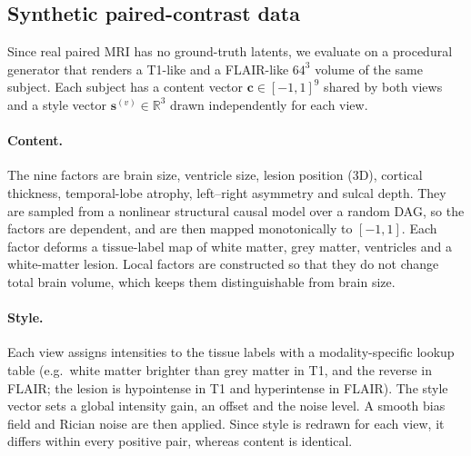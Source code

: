 
\subsection{Synthetic paired-contrast data}
\label{sec:synthetic-data}

Since real paired MRI has no ground-truth latents, we evaluate on a procedural
generator that renders a T1-like and a FLAIR-like $64^3$ volume of the same
subject. Each subject has a content vector $\mathbf{c}\in[-1,1]^{9}$ shared by
both views and a style vector $\mathbf{s}^{(v)}\in\mathbb{R}^{3}$ drawn
independently for each view.

\paragraph{Content.}
The nine factors are brain size, ventricle size, lesion position (3D),
cortical thickness, temporal-lobe atrophy, left--right asymmetry and sulcal
depth. They are sampled from a nonlinear structural causal model over a random
DAG, so the factors are dependent, and are then mapped monotonically to
$[-1,1]$. Each factor deforms a tissue-label map of white matter, grey matter,
ventricles and a white-matter lesion. Local factors are constructed so that
they do not change total brain volume, which keeps them distinguishable from
brain size.

\paragraph{Style.}
Each view assigns intensities to the tissue labels with a modality-specific
lookup table (e.g.\ white matter brighter than grey matter in T1, and the
reverse in FLAIR; the lesion is hypointense in T1 and hyperintense in FLAIR).
The style vector sets a global intensity gain, an offset and the noise level.
A smooth bias field and Rician noise are then applied. Since style is redrawn
for each view, it differs within every positive pair, whereas content is
identical.

